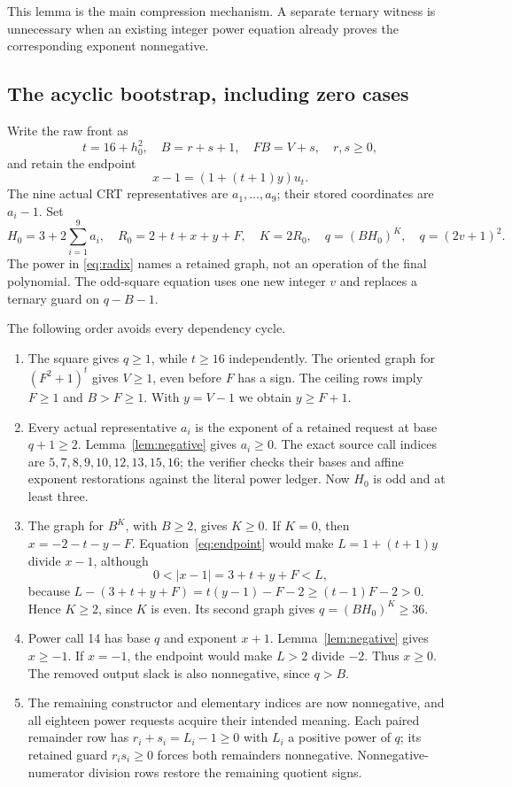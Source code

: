 \documentclass[11pt]{article}
\theoremstyle{remark}\newtheorem{remark}[theorem]{Remark}
\begin{document}
This lemma is the main compression mechanism. A separate ternary witness
is unnecessary when an existing integer power equation already proves the
corresponding exponent nonnegative.

\subsection{The acyclic bootstrap, including zero cases}

Write the raw front as
\[
 t=16+h_0^2,\quad B=r+s+1,\quad FB=V+s,\quad r,s\ge0,
\]
and retain the endpoint
\begin{equation}\label{eq:endpoint}
 x-1=(1+(t+1)y)u_t.
\end{equation}
The nine actual CRT representatives are $a_1,\ldots,a_9$; their stored
coordinates are $a_i-1$. Set
\begin{equation}\label{eq:radix}
 H_0=3+2\sum_{i=1}^9a_i,\quad R_0=2+t+x+y+F,\quad K=2R_0,
 \quad q=(BH_0)^K,\quad q=(2v+1)^2.
\end{equation}
The power in \eqref{eq:radix} names a retained graph, not an operation of
the final polynomial. The odd-square equation uses one new integer $v$
and replaces a ternary guard on $q-B-1$.

The following order avoids every dependency cycle.
\begin{enumerate}
\item The square gives $q\ge1$, while $t\ge16$ independently. The oriented
graph for $(F^2+1)^t$ gives $V\ge1$, even before $F$ has a sign. The ceiling
rows imply $F\ge1$ and $B>F\ge1$. With $y=V-1$ we obtain $y\ge F+1$.
\item Every actual representative $a_i$ is the exponent of a retained
request at base $q+1\ge2$. Lemma~\ref{lem:negative} gives $a_i\ge0$.
The exact source call indices are $5,7,8,9,10,12,13,15,16$; the verifier
checks their bases and affine exponent restorations against the literal
power ledger. Now $H_0$ is odd and at least three.
\item The graph for $B^K$, with $B\ge2$, gives $K\ge0$. If $K=0$, then
$x=-2-t-y-F$. Equation~\eqref{eq:endpoint} would make
$L=1+(t+1)y$ divide $x-1$, although
\[
 0<|x-1|=3+t+y+F<L,
\]
because $L-(3+t+y+F)=t(y-1)-F-2\ge(t-1)F-2>0$.
Hence $K\ge2$, since $K$ is even. Its second graph gives
$q=(BH_0)^K\ge36$.
\item Power call 14 has base $q$ and exponent $x+1$.
Lemma~\ref{lem:negative} gives $x\ge-1$. If $x=-1$, the endpoint would
make $L>2$ divide $-2$. Thus $x\ge0$. The removed output slack is also
nonnegative, since $q>B$.
\item The remaining constructor and elementary indices are now
nonnegative, and all eighteen power requests acquire their intended
meaning. Each paired remainder row has
$r_i+s_i=L_i-1\ge0$ with $L_i$ a positive power of $q$; its retained
guard $r_is_i\ge0$ forces both remainders nonnegative. Nonnegative-numerator division
rows restore the remaining quotient signs.
\end{enumerate}
\end{document}
